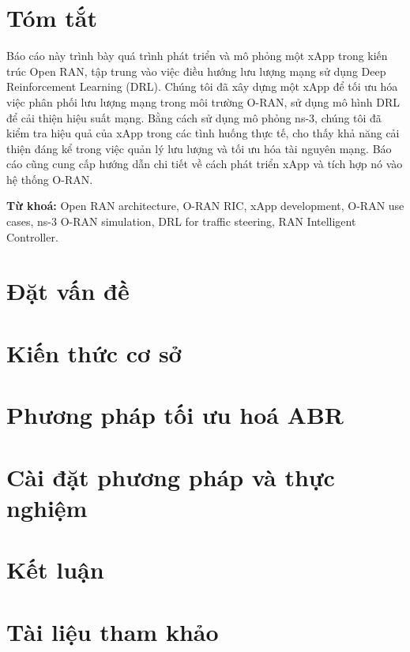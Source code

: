 \documentclass[12pt]{report}
\begin{document}
\chapter*{Tóm tắt}
Báo cáo này trình bày quá trình phát triển và mô phỏng một xApp trong kiến trúc Open RAN, tập trung vào việc điều hướng lưu lượng mạng sử dụng Deep Reinforcement Learning (DRL). Chúng tôi đã xây dựng một xApp để tối ưu hóa việc phân phối lưu lượng mạng trong môi trường O-RAN, sử dụng mô hình DRL để cải thiện hiệu suất mạng. Bằng cách sử dụng mô phỏng ns-3, chúng tôi đã kiểm tra hiệu quả của xApp trong các tình huống thực tế, cho thấy khả năng cải thiện đáng kể trong việc quản lý lưu lượng và tối ưu hóa tài nguyên mạng. Báo cáo cũng cung cấp hướng dẫn chi tiết về cách phát triển xApp và tích hợp nó vào hệ thống O-RAN.

\textbf{Từ khoá:} Open RAN architecture, O-RAN RIC, xApp development, O-RAN use cases, ns-3 O-RAN simulation, DRL for traffic steering, RAN Intelligent Controller.

\tableofcontents





\chapter{Đặt vấn đề}
% 

\chapter{Kiến thức cơ sở}
% 

\chapter{Phương pháp tối ưu hoá ABR}
% 

\chapter{Cài đặt phương pháp và thực nghiệm}
% 

\chapter{Kết luận}
% 

\chapter*{Tài liệu tham khảo}
% 

\end{document}
